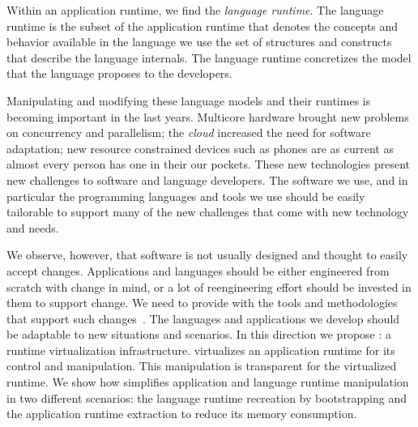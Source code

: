 Within an application runtime, we find the \emph{language runtime}. The language runtime is the subset of the application runtime that denotes the concepts and behavior available in the language we use \ie the set of structures and constructs that describe the language internals. The language runtime concretizes the model that the language proposes to the developers.

Manipulating and modifying these language models and their runtimes is becoming important in the last years. Multicore hardware brought new problems on concurrency and parallelism; the \emph{cloud} increased the need for software adaptation; new resource constrained devices such as phones are as current as almost every person has one in their our pockets. These new technologies present new challenges to software and language developers. The software we use, and in particular the programming languages and tools we use should be easily tailorable to support many of the new challenges that come with new technology and needs.

We observe, however, that software is not usually designed and thought to easily accept changes. Applications and languages should be either engineered from scratch with change in mind, or a lot of reengineering effort should be invested in them to support change. We need to provide with the tools and methodologies that support such changes~\cite{Nier08b}. The languages and applications we develop should be adaptable to new situations and scenarios. In this direction we propose \emph{\Vtt}: a runtime virtualization infrastructure. \Vtt virtualizes an application runtime for its control and manipulation. This manipulation is transparent for the virtualized runtime. We show how \Vtt simplifies application and language runtime manipulation in two different scenarios: the language runtime recreation by bootstrapping and the application runtime extraction to reduce its memory consumption.




